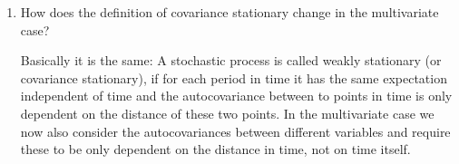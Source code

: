 \documentclass[a4paper]{scrartcl}
\begin{document}
\begin{enumerate}
\begin{solution}
\begin{align*}
\begin{pmatrix}
                                          \vdots                                              & \ddots & \vdots                                               \\
                                          (y_{K,t}- E[y_{K,t}])(y_{1,{t-h}} - E[y_{1,{t-h}}]) & \dots  & (y_{K,t} - E[y_{K,t}])(y_{K,{t-h}} - E[y_{K,{t-h}}])
                                      \end{pmatrix} \right]                                         \\
                       & = \begin{pmatrix}
                               E[(y_{1,t}- E[y_{1,t}])(y_{1,{t-h}} - E[y_{1,{t-h}}])] & \dots  & E[(y_{1,t} - E[y_{1,t}])(y_{K,{t-h}} - E[y_{K,{t-h}}])] \\
                               \vdots                                                 & \ddots & \vdots                                                  \\
                               E[(y_{K,t}- E[y_{K,t}])(y_{1,{t-h}} - E[y_{1,{t-h}}])] & \dots  & E[(y_{K,t} - E[y_{K,t}])(y_{K,{t-h}} - E[y_{K,{t-h}}])]
                           \end{pmatrix}                                     \\
                       & =\begin{pmatrix}
                              Cov(y_{1,t},y_{1,{t-h}}) & \dots  & Cov(y_{1,t},y_{K,{t-h}}) \\
                              \vdots                   & \ddots & \vdots                   \\
                              Cov(y_{K,t},y_{1,{t-h}}) & \dots  & Cov(y_{K,t},y_{K,{t-h}})
                          \end{pmatrix}
                  \end{align*}
                  On the diagonals we have the autocovariance of each variable, on the off-diagonals we have the covariances between the different variables.
              \end{solution}
        \item How does the definition of covariance stationary change in the multivariate case?
              \begin{solution}
                  Basically it is the same: A stochastic process is called weakly stationary (or covariance stationary), if for each period in time it has the same expectation independent of time and the autocovariance between to points in time is only dependent on the distance of these two points. In the multivariate case we now also consider the autocovariances between different variables and require these to be only dependent on the distance in time, not on time itself.\\

\end{solution}
\end{enumerate}
\end{document}
